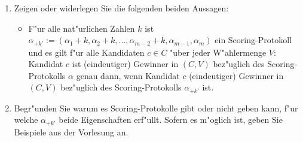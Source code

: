 \documentclass[a4paper,12pt,titlepage,oneside]{article}
\begin{document}
\begin{enumerate}
\item Zeigen oder widerlegen Sie die folgenden beiden Aussagen:
\begin{itemize}
\item F"ur alle nat"urlichen Zahlen $k$ ist $\alpha_{+k'} := (\alpha_1 + k, \alpha_2 + k, . . . ,\alpha_{m-2}+k,\alpha_{m-1},\alpha_{m})$ ein
Scoring-Protokoll und es gilt f"ur alle Kandidaten $c \in C$ "uber jeder W"ahlermenge $V$:
Kandidat $c$ ist (eindeutiger) Gewinner in $(C, V)$ bez"uglich des Scoring-Protokolls $\alpha$ genau dann, wenn Kandidat $c$ (eindeutiger) Gewinner in $(C, V)$ bez"uglich des
Scoring-Protokolls $\alpha_{+k'}$ ist.
\end{itemize}
\item Begr"unden Sie warum es Scoring-Protokolle gibt oder nicht geben kann, f"ur welche $\alpha_{+k'}$ beide Eigenschaften erf"ullt. Sofern es m"oglich ist, geben Sie Beispiele aus der Vorlesung an.\\
\end{enumerate}

\vspace{0.5cm}
\end{document}
